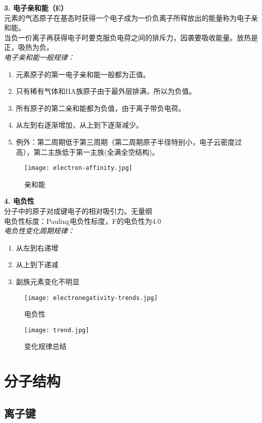 \documentclass[utf8,a4paper,12pt]{ctexart}
\begin{document}
{\bf 3. 电子亲和能（E）}\\
元素的气态原子在基态时获得一个电子成为一价负离子所释放出的能量称为电子亲和能。\\
当负一价离子再获得电子时要克服负电荷之间的排斥力，因袭要吸收能量。放热是正，吸热为负。\\
\emph{电子亲和能一般规律：}
\begin{enumerate}[1)]
\item 元素原子的第一电子亲和能一般都为正值。
\item 只有稀有气体和IIA族原子由于最外层排满，所以为负值。
\item 所有原子的第二亲和能都为负值，由于离子带负电荷。
\item 从左到右逐渐增加，从上到下逐渐减少。
\item 例外：第二周期低于第三周期（第二周期原子半径特别小，电子云密度过高），第二主族低于第一主族(全满全空结构)。
\end{enumerate}
\begin{figure}[H]
\centering
\texttt{[image: electron-affinity.jpg]}
\caption{亲和能}
\end{figure}
{\bf 4. 电负性}\\
分子中的原子对成键电子的相对吸引力。无量纲\\
电负性标度：Pauling电负性标度，F的电负性为4.0\\
\emph{电负性变化周期规律：}
\begin{enumerate}[1)]
\item 从左到右递增
\item 从上到下递减
\item 副族元素变化不明显
\end{enumerate}
\begin{figure}[H]
\centering
\texttt{[image: electronegativity-trends.jpg]}
\caption{电负性}
\end{figure}
\begin{figure}[H]
\centering
\texttt{[image: trend.jpg]}
\caption{变化规律总结}
\end{figure}

\newpage
\section{分子结构}
\subsection{离子键}
\end{document}
